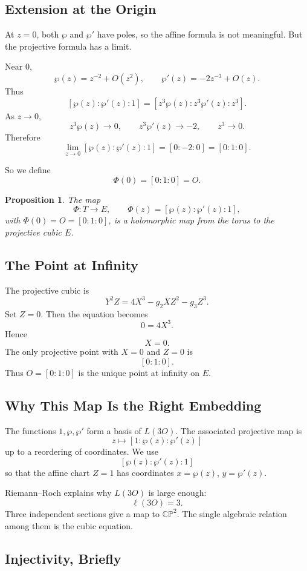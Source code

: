 \documentclass[11pt]{article}
\newcommand{\CP}{\mathbb{CP}}
\newtheorem*{proposition}{Proposition}
\begin{document}
\subsection{Extension at the Origin}

At \(z=0\), both \(\wp\) and \(\wp'\) have poles, so the affine formula is
not meaningful.  But the projective formula has a limit.

Near \(0\),
\[
\wp(z)=z^{-2}+O(z^2),
\qquad
\wp'(z)=-2z^{-3}+O(z).
\]
Thus
\[
[\wp(z):\wp'(z):1]
=
[z^3\wp(z):z^3\wp'(z):z^3].
\]
As \(z\to0\),
\[
z^3\wp(z)\to0,\qquad
z^3\wp'(z)\to-2,\qquad
z^3\to0.
\]
Therefore
\[
\lim_{z\to0}[\wp(z):\wp'(z):1]
=[0:-2:0]=[0:1:0].
\]

So we define
\[
\Phi(0)=[0:1:0]=O.
\]

\begin{proposition}
The map
\[
\Phi:T\to E,\qquad
\Phi(z)=[\wp(z):\wp'(z):1],
\]
with \(\Phi(0)=O=[0:1:0]\), is a holomorphic map from the torus to the
projective cubic \(E\).
\end{proposition}

\subsection{The Point at Infinity}

The projective cubic is
\[
Y^2Z=4X^3-g_2XZ^2-g_3Z^3.
\]
Set \(Z=0\).  Then the equation becomes
\[
0=4X^3.
\]
Hence
\[
X=0.
\]
The only projective point with \(X=0\) and \(Z=0\) is
\[
[0:1:0].
\]
Thus \(O=[0:1:0]\) is the unique point at infinity on \(E\).

\subsection{Why This Map Is the Right Embedding}

The functions \(1,\wp,\wp'\) form a basis of \(L(3O)\).  The associated
projective map is
\[
z\longmapsto [1:\wp(z):\wp'(z)]
\]
up to a reordering of coordinates.  We use
\[
[\wp(z):\wp'(z):1]
\]
so that the affine chart \(Z=1\) has coordinates \(x=\wp(z)\),
\(y=\wp'(z)\).

Riemann--Roch explains why \(L(3O)\) is large enough:
\[
\ell(3O)=3.
\]
Three independent sections give a map to \(\CP^2\).  The single algebraic
relation among them is the cubic equation.

\subsection{Injectivity, Briefly}
\end{document}

